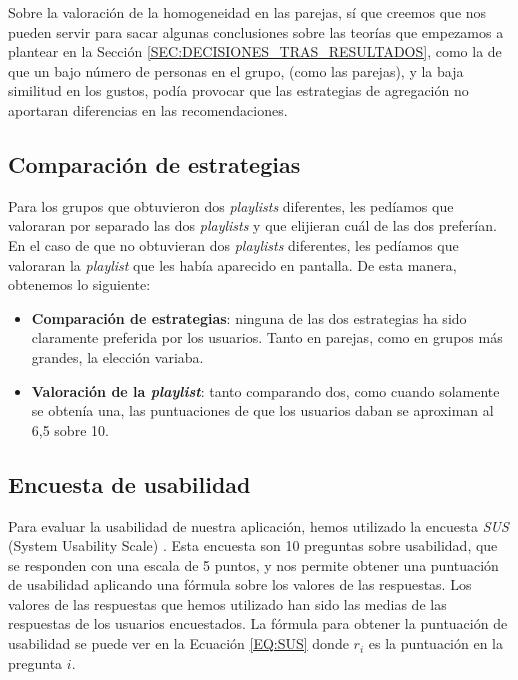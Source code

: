 Sobre la valoración de la homogeneidad en las parejas, sí que creemos que nos pueden servir para sacar algunas
conclusiones sobre las teorías que empezamos a plantear en la Sección \ref{SEC:DECISIONES_TRAS_RESULTADOS}, como la de que 
un bajo número de personas en el grupo, (como las parejas), y la baja similitud en los gustos, podía provocar que 
las estrategias de agregación no aportaran diferencias en las recomendaciones.

\subsection{Comparación de estrategias\label{SEC:COMPARACION_ESTRATEGIAS}}

Para los grupos que obtuvieron dos \textit{playlists} diferentes, les pedíamos que valoraran por separado las dos \textit{playlists} 
y que elijieran cuál de las dos preferían. En el caso de que no obtuvieran dos \textit{playlists} diferentes, les pedíamos que 
valoraran la \textit{playlist} que les había aparecido en pantalla. De esta manera, obtenemos lo siguiente:

\begin{itemize}
    \item \textbf{Comparación de estrategias}: ninguna de las dos estrategias ha sido claramente preferida por los usuarios. Tanto en parejas, 
    como en grupos más grandes, la elección variaba.
    \item \textbf{Valoración de la \textit{playlist}}: tanto comparando dos, como cuando solamente se obtenía una, las puntuaciones de
    que los usuarios daban se aproximan al 6,5 sobre 10.
\end{itemize}

\subsection{Encuesta de usabilidad\label{SEC:ENCUESTA_USABILIDAD}}

Para evaluar la usabilidad de nuestra aplicación, hemos utilizado la encuesta \textit{SUS} (System Usability Scale) 
\cite{brooke1986system}. Esta encuesta son 10 preguntas sobre usabilidad, que se responden con una escala de 5 puntos, y 
nos permite obtener una puntuación de usabilidad aplicando una fórmula sobre los valores de las respuestas. Los valores 
de las respuestas que hemos utilizado han sido las medias de las respuestas de los usuarios encuestados. La fórmula para 
obtener la puntuación de usabilidad se puede ver en la Ecuación \ref{EQ:SUS} donde $r_i$ es la puntuación en la pregunta
$i$.

